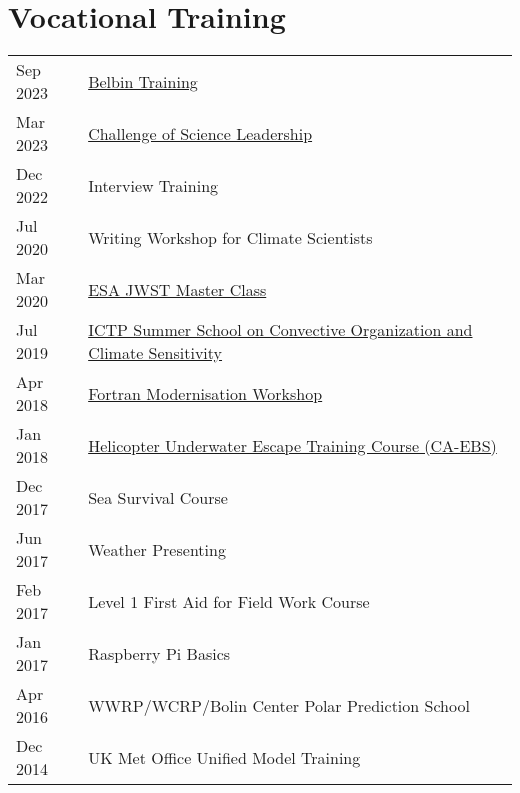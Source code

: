 \documentclass[a4paper, 11pt]{article}
\begin{document}
\section{Vocational Training}
\begin{tabularx}{\linewidth}{@{}l X@{}}
Sep 2023 & \href{https://www.belbin.com}{Belbin Training} \\
Mar 2023 & \href{http://www.scienceleadership.co.uk}{Challenge of Science Leadership} \\
Dec 2022 & Interview Training \\
Jul 2020 & Writing Workshop for Climate Scientists \\
Mar 2020 & \href{https://ers-imaging.github.io/uk_workshop}{ESA JWST Master Class} \\
Jul 2019 & \href{https://indico.ictp.it/event/8669}{ICTP Summer School on Convective Organization and Climate Sensitivity} \\
Apr 2018 & \href{https://www.nag.com/content/fortran-modernization-workshop}{Fortran Modernisation Workshop} \\
Jan 2018 & \href{http://www.petans.co.uk/courses/survival/huet-caebs/}{Helicopter Underwater Escape Training Course (CA-EBS)} \\
Dec 2017 & Sea Survival Course \\
Jun 2017 & Weather Presenting \\
Feb 2017 & Level 1 First Aid for Field Work Course \\
Jan 2017 & Raspberry Pi Basics \\
Apr 2016 & WWRP/WCRP/Bolin Center Polar Prediction School \\
Dec 2014 & UK Met Office Unified Model Training \\
\end{tabularx}
\end{document}
